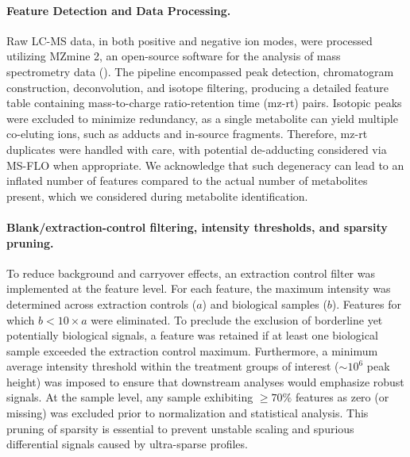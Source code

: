 \documentclass[9pt,twocolumn,twoside]{rilabRxiv}
\begin{document}
\paragraph{Feature Detection and Data Processing.} Raw LC-MS data, in both positive and negative ion modes, were processed utilizing MZmine 2, an open-source software for the analysis of mass spectrometry data (\cite{Pluskal2010MZmine2}). The pipeline encompassed peak detection, chromatogram construction, deconvolution, and isotope filtering, producing a detailed feature table containing mass-to-charge ratio-retention time (mz-rt) pairs. Isotopic peaks were excluded to minimize redundancy, as a single metabolite can yield multiple co-eluting ions, such as adducts and in-source fragments. Therefore, mz-rt duplicates were handled with care, with potential de-adducting considered via MS-FLO when appropriate. We acknowledge that such degeneracy can lead to an inflated number of features compared to the actual number of metabolites present, which we considered during metabolite identification. 

\paragraph{Blank/extraction-control filtering, intensity thresholds, and sparsity pruning.}
To reduce background and carryover effects, an extraction control filter was implemented at the feature level. For each feature, the maximum intensity was determined across extraction controls (\(a\)) and biological samples (\(b\)). Features for which \(b < 10\times a\) were eliminated. To preclude the exclusion of borderline yet potentially biological signals, a feature was retained if at least one biological sample exceeded the extraction control maximum. Furthermore, a minimum average intensity threshold within the treatment groups of interest (\(\sim 10^{6}\) peak height) was imposed to ensure that downstream analyses would emphasize robust signals. At the sample level, any sample exhibiting \(\geq 70\%\) features as zero (or missing) was excluded prior to normalization and statistical analysis. This pruning of sparsity is essential to prevent unstable scaling and spurious differential signals caused by ultra-sparse profiles. 
\end{document}
